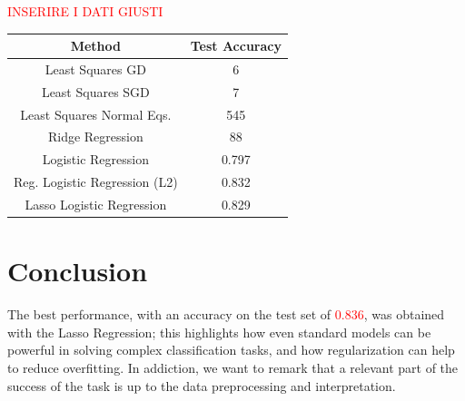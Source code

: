 \documentclass[10pt,conference,compsocconf]{IEEEtran}
\begin{document}
\textcolor{red}{INSERIRE I DATI GIUSTI}
\begin{center}
\label{table1}
\begin{tabular}{|c c|} 
 \hline
 Method & Test Accuracy  \\ [0.5ex] 
 \hline\hline
 Least Squares GD & 6   \\ 
 \hline
 Least Squares SGD & 7  \\
 \hline
 Least Squares Normal Eqs. & 545   \\
 \hline
 Ridge Regression & 88   \\ 
 \hline
 Logistic Regression & 0.797   \\
 \hline
 Reg. Logistic Regression (L2) & 0.832   \\
 \hline
 Lasso Logistic Regression & 0.829   \\
 \hline
\end{tabular}
\end{center}



\section{Conclusion}

The best performance, with an accuracy on the test set of \textcolor{red}{0.836}, was obtained with the Lasso Regression; this highlights how even standard models can be powerful in solving complex classification tasks, and how regularization can help to reduce overfitting.
In addiction, we want to remark that a relevant part of the success of the task is up to the data preprocessing and interpretation.
\end{document}
